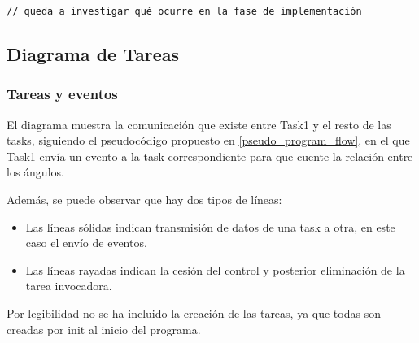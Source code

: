 \documentclass[a4paper,openright,12pt]{article}
\begin{document}
\begin{itemize}
\begin{samepage}
\begin{verbatim}
// queda a investigar qué ocurre en la fase de implementación
    \end{verbatim}
    \end{samepage}

\end{itemize}

\subsection{Diagrama de Tareas}\label{tasks}
\subsubsection{Tareas y eventos}
El diagrama muestra la comunicación que existe entre Task1 y el resto de las tasks, siguiendo el pseudocódigo propuesto en \ref{pseudo_program_flow}, en el que Task1 envía un evento
a la task correspondiente para que cuente la relación entre los ángulos.

Además, se puede observar que hay dos tipos de líneas:
\begin{itemize}
    \item Las líneas sólidas indican transmisión de datos de una task a otra, en este caso el envío de eventos.
    \item Las líneas rayadas indican la cesión del control y posterior eliminación de la tarea invocadora.
\end{itemize}

Por legibilidad no se ha incluido la creación de las tareas, ya que todas son creadas por init al inicio del programa.
\end{document}
